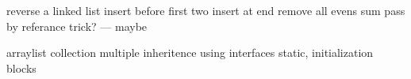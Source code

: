 \documentclass[../../main.tex]{subfiles}
\begin{document}
reverse a linked list
insert before first two
insert at end
remove all evens
sum
pass by referance trick? --- maybe


arraylist collection
multiple inheritence using interfaces
static, initialization blocks
\end{document}
